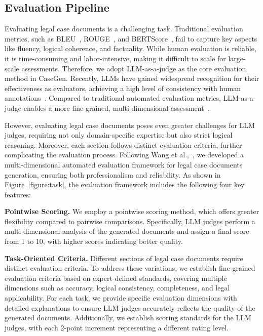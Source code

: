 \subsection{Evaluation Pipeline}
Evaluating legal case documents is a challenging task. Traditional evaluation metrics, such as BLEU~\cite{papineni2002bleu}, ROUGE~\cite{lin2004rouge}, and BERTScore~\cite{zhang2019bertscore}, fail to capture key aspects like fluency, logical coherence, and factuality. 
While human evaluation is reliable, it is time-consuming and labor-intensive, making it difficult to scale for large-scale assessments.
Therefore, we adopt LLM-as-a-judge as the core evaluation method in CaseGen. Recently, LLMs have gained widespread recognition for their effectiveness as evaluators, achieving a high level of consistency with human annotations~\cite{li2024llms}. Compared to traditional automated evaluation metrics, LLM-as-a-judge enables a more fine-grained, multi-dimensional assessment~\cite{10.1145/3627673.3679677,li2024calibraeval}.


However, evaluating legal case documents poses even greater challenges for LLM judges, requiring not only domain-specific expertise but also strict logical reasoning. Moreover, each section follows distinct evaluation criteria, further complicating the evaluation process.
Following Wang et al.,~\cite{wang2024user}, we developed a multi-dimensional automated evaluation framework for legal case documents generation, ensuring both professionalism and reliability. 
As shown in Figure~\ref{figure:task}, the evaluation framework includes the following four key features:

\textbf{Pointwise Scoring.} 
We employ a pointwise scoring method, which offers greater flexibility compared to pairwise comparisons. Specifically, LLM judges perform a multi-dimensional analysis of the generated documents and assign a final score from 1 to 10, with higher scores indicating better quality.


\textbf{Task-Oriented Criteria.}
Different sections of legal case documents require distinct evaluation criteria.
To address these variations, we establish fine-grained evaluation criteria based on expert-defined standards, covering multiple dimensions such as accuracy, logical consistency, completeness, and legal applicability.
For each task, we provide specific evaluation dimensions with detailed explanations to ensure LLM judges accurately reflects the quality of the generated documents.
Additionally, we establish scoring standards for the LLM judges, with each 2-point increment representing a different rating level. 



